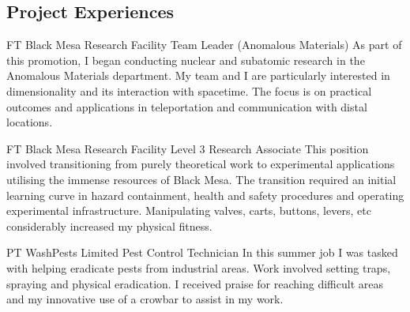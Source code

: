 \documentclass[10pt]{article} %
\begin{document}
\begin{paracol}{2}
\section{Project Experiences}





{FT} %
{Black Mesa Research Facility} %
{Team Leader (Anomalous Materials)} %
{As part of this promotion, I began conducting nuclear and subatomic research in the Anomalous Materials department. My team and I are particularly interested in dimensionality and its interaction with spacetime. The focus is on practical outcomes and applications in teleportation and communication with distal locations.} %


{FT} %
{Black Mesa Research Facility} %
{Level 3 Research Associate} %
{This position involved transitioning from purely theoretical work to experimental applications utilising the immense resources of Black Mesa. The transition required an initial learning curve in hazard containment, health and safety procedures and operating experimental infrastructure. Manipulating valves, carts, buttons, levers, etc considerably increased my physical fitness.}  %


{PT} %
{WashPests Limited} %
{Pest Control Technician} %
{In this summer job I was tasked with helping eradicate pests from industrial areas. Work involved setting traps, spraying and physical eradication. I received praise for reaching difficult areas and my innovative use of a crowbar to assist in my work.} %


\vspace{-\baselineskip}\medskip %


\end{paracol}
\end{document}
